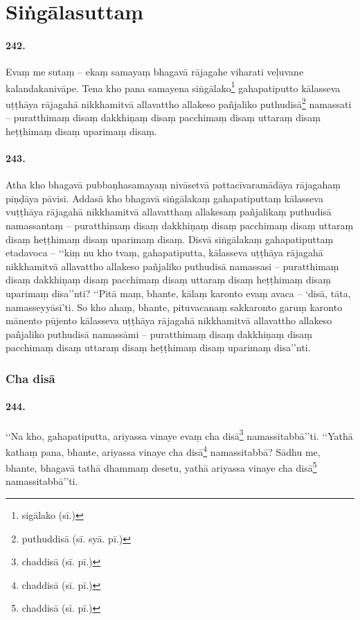 \section{Siṅgālasuttaṃ}

\paragraph{242.} Evaṃ me sutaṃ – ekaṃ samayaṃ bhagavā rājagahe viharati veḷuvane kalandakanivāpe. Tena kho pana samayena siṅgālako\footnote{sigālako (sī.)} gahapatiputto kālasseva uṭṭhāya rājagahā nikkhamitvā allavattho allakeso pañjaliko puthudisā\footnote{puthuddisā (sī. syā. pī.)} namassati – puratthimaṃ disaṃ dakkhiṇaṃ disaṃ pacchimaṃ disaṃ uttaraṃ disaṃ heṭṭhimaṃ disaṃ uparimaṃ disaṃ.

\paragraph{243.} Atha kho bhagavā pubbaṇhasamayaṃ nivāsetvā pattacīvaramādāya rājagahaṃ piṇḍāya pāvisi. Addasā kho bhagavā siṅgālakaṃ gahapatiputtaṃ kālasseva vuṭṭhāya rājagahā nikkhamitvā allavatthaṃ allakesaṃ pañjalikaṃ puthudisā namassantaṃ – puratthimaṃ disaṃ dakkhiṇaṃ disaṃ pacchimaṃ disaṃ uttaraṃ disaṃ heṭṭhimaṃ disaṃ uparimaṃ disaṃ. Disvā siṅgālakaṃ gahapatiputtaṃ etadavoca – ‘‘kiṃ nu kho tvaṃ, gahapatiputta, kālasseva uṭṭhāya rājagahā nikkhamitvā allavattho allakeso pañjaliko puthudisā namassasi – puratthimaṃ disaṃ dakkhiṇaṃ disaṃ pacchimaṃ disaṃ uttaraṃ disaṃ heṭṭhimaṃ disaṃ uparimaṃ disa’’nti? ‘‘Pitā maṃ, bhante, kālaṃ karonto evaṃ avaca – ‘disā, tāta, namasseyyāsī’ti. So kho ahaṃ, bhante, pituvacanaṃ sakkaronto garuṃ karonto mānento pūjento kālasseva uṭṭhāya rājagahā nikkhamitvā allavattho allakeso pañjaliko puthudisā namassāmi – puratthimaṃ disaṃ dakkhiṇaṃ disaṃ pacchimaṃ disaṃ uttaraṃ disaṃ heṭṭhimaṃ disaṃ uparimaṃ disa’’nti.

\subsubsection{Cha disā}

\paragraph{244.} ‘‘Na kho, gahapatiputta, ariyassa vinaye evaṃ cha disā\footnote{chaddisā (sī. pī.)} namassitabbā’’ti. ‘‘Yathā kathaṃ pana, bhante, ariyassa vinaye cha disā\footnote{chaddisā (sī. pī.)} namassitabbā? Sādhu me, bhante, bhagavā tathā dhammaṃ desetu, yathā ariyassa vinaye cha disā\footnote{chaddisā (sī. pī.)} namassitabbā’’ti.

